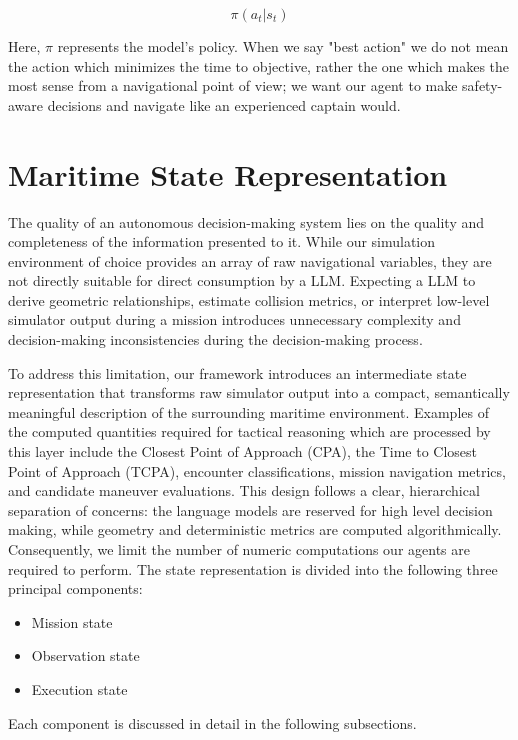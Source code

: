 \documentclass[10pt]{reportMaster}
\begin{document}
\begin{equation}
    \pi(a_t|s_t)
\end{equation}

Here, $\pi$ represents the model's policy. When we say "best action" we do not mean the action which minimizes the time to objective, rather the one which makes the most sense from a navigational point of view; we want our agent to make safety-aware decisions and navigate like an experienced captain would.


\section{Maritime State Representation}

The quality of an autonomous decision-making system lies on the quality and completeness of the information presented to it. While our simulation environment of choice provides an array of raw navigational variables, they are not directly suitable for direct consumption by a LLM. Expecting a LLM to derive geometric relationships, estimate collision metrics, or interpret low-level simulator output during a mission introduces unnecessary complexity and decision-making inconsistencies during the decision-making process.

To address this limitation, our framework introduces an intermediate state representation that transforms raw simulator output into a compact, semantically meaningful description of the surrounding maritime environment. Examples of the computed quantities required for tactical reasoning which are processed by this layer include the Closest Point of Approach (CPA), the Time to Closest Point of Approach (TCPA), encounter classifications, mission navigation metrics, and candidate maneuver evaluations. This design follows a clear, hierarchical separation of concerns: the language models are reserved for high level decision making, while geometry and deterministic metrics are computed algorithmically. Consequently, we limit the number of numeric computations our agents are required to perform. The state representation is divided into the following three principal components:

\begin{itemize}
    \item Mission state
    \item Observation state
    \item Execution state
\end{itemize}

Each component is discussed in detail in the following subsections.
\end{document}
